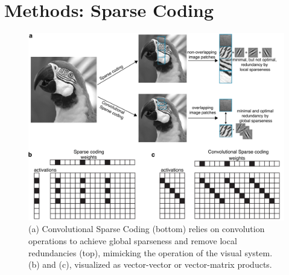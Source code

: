 \section{Methods: Sparse Coding}
\begin{figure}[h!tbp]
\vspace{0.1cm}
\centering
\includegraphics[width=1.\textwidth]{fig/chap3_csc.pdf}
\caption[Convolutional Sparse Coding.]{(a) Convolutional Sparse Coding (bottom) relies on convolution operations to achieve global sparseness and remove local redundancies (top), mimicking the operation of the visual system. (b) and (c), visualized as vector-vector or vector-matrix products.}
\label{fig_chap3_csc}
\end{figure}

